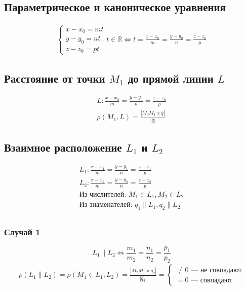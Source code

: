 \documentclass{article}
\begin{document}
\subsection{Параметрическое и каноническое уравнения}
\begin{gather*}
    \begin{cases}
        x - x_0 = mt \\
        y - y_0 = nt \\
        z - z_0 = pt
    \end{cases} t \in \mathbb{R} 
    \Leftrightarrow t = \frac{x - x_0}{m} = \frac{y - y_0}{n} = \frac{z - z_0}{p}
\end{gather*}


\subsection{Расстояние от точки $M_1$ до прямой линии $L$}
\begin{gather*}
    L: \frac{x - x_0}{m} = \frac{y - y_0}{n} = \frac{z - z_0}{p} \\
    \rho(M_1, L) = \frac{\left| \overline{M_0 M_1} \times \overline{q} \right|}{\left| \overline{q} \right|}
\end{gather*}


\subsection{Взаимное расположение $L_1$ и $L_2$}
\begin{gather*}
    L_1: \frac{x - x_1}{m} = \frac{y - y_1}{n} = \frac{z - z_1}{p} \\
    L_2: \frac{x - x_2}{m} = \frac{y - y_2}{n} = \frac{z - z_2}{p} \\
    \text{Из числителей: }   M_1 \in L_1, M_2 \in L_2 \\
    \text{Из знаменателей: } \overline{q_1} \parallel L_1, \overline{q_2} \parallel L_2 \\
\end{gather*}

\subsubsection{Случай 1}
\[
    L_1 \parallel L_2 \Leftrightarrow \frac{m_1}{m_2} = \frac{n_1}{n_2} = \frac{p_1}{p_2}
\]
\begin{gather*}
    \rho(L_1 \parallel L_2) = 
    \rho(M_1 \in L_1, L_2) = 
    \frac{\left| \overline{M_2 M_1} \times \overline{q_2} \right|}{\left| \overline{q_2} \right|} =
    \begin{cases}
        \neq 0 \text{ --- не совпадают} \\
           = 0 \text{ --- совпадают}
    \end{cases}
\end{gather*}
\end{document}
